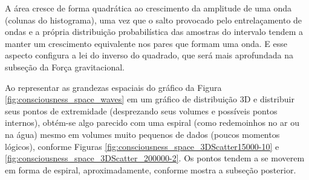 A área cresce de forma quadrática ao crescimento da amplitude de uma onda (colunas do histograma), uma vez que o salto provocado pelo entrelaçamento de ondas e a própria distribuição probabilística das amostras do intervalo tendem a manter um crescimento equivalente nos pares que formam uma onda. E esse aspecto configura a lei do inverso do quadrado, que será mais aprofundada na subseção da Força gravitacional.

Ao representar as grandezas espaciais do gráfico da Figura \ref{fig:consciousness_space_waves} em um gráfico de distribuição 3D e distribuir seus pontos de extremidade (desprezando seus volumes e possíveis pontos internos), obtém-se algo parecido com uma espiral (como redemoinhos no ar ou na água) mesmo em volumes muito pequenos de dados (poucos momentos lógicos), conforme Figuras \ref{fig:consciousness_space_3DScatter15000-10} e \ref{fig:consciousness_space_3DScatter_200000-2}. Os pontos tendem a se moverem em forma de espiral, aproximadamente, conforme mostra a subseção posterior. 
